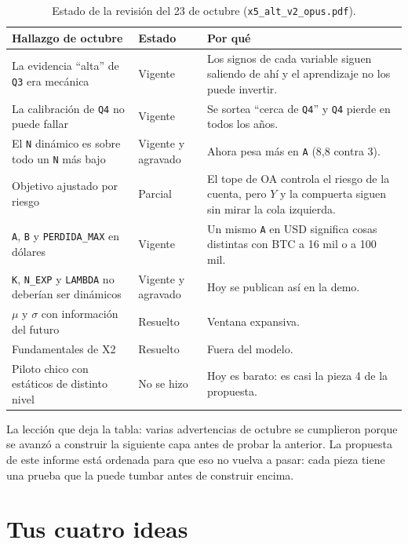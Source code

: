 \documentclass[11pt,a4paper]{article}
\newcommand{\code}[1]{\texttt{\small #1}}
\begin{document}
\begin{table}[h]
\centering\small
\begin{tabularx}{\linewidth}{@{}>{\raggedright\arraybackslash}p{5.4cm}>{\raggedright\arraybackslash}p{2.2cm}>{\raggedright\arraybackslash}X@{}}
\toprule
Hallazgo de octubre & Estado & Por qué \\
\midrule
La evidencia ``alta'' de \code{Q3} era mecánica & Vigente & Los signos de cada variable siguen saliendo de
ahí y el aprendizaje no los puede invertir. \\
La calibración de \code{Q4} no puede fallar & Vigente & Se sortea ``cerca de \code{Q4}'' y \code{Q4} pierde en
todos los años. \\
El \code{N} dinámico es sobre todo un \code{N} más bajo & Vigente y agravado & Ahora pesa más en \code{A}
(8,8 contra 3). \\
Objetivo ajustado por riesgo & Parcial & El tope de OA controla el riesgo de la cuenta, pero $Y$ y la compuerta
siguen sin mirar la cola izquierda. \\
\code{A}, \code{B} y \code{PERDIDA\_MAX} en dólares & Vigente & Un mismo \code{A} en USD significa cosas
distintas con BTC a 16 mil o a 100 mil. \\
\code{K}, \code{N\_EXP} y \code{LAMBDA} no deberían ser dinámicos & Vigente y agravado & Hoy se publican así
en la demo. \\
$\mu$ y $\sigma$ con información del futuro & Resuelto & Ventana expansiva. \\
Fundamentales de X2 & Resuelto & Fuera del modelo. \\
Piloto chico con estáticos de distinto nivel & No se hizo & Hoy es barato: es casi la pieza 4 de la propuesta. \\
\bottomrule
\end{tabularx}
\caption{Estado de la revisión del 23 de octubre (\code{x5\_alt\_v2\_opus.pdf}).}
\end{table}

La lección que deja la tabla: varias advertencias de octubre se cumplieron porque se avanzó a construir
la siguiente capa antes de probar la anterior. La propuesta de este informe está ordenada para que eso no
vuelva a pasar: cada pieza tiene una prueba que la puede tumbar antes de construir encima.

\section{Tus cuatro ideas}
\label{sec:ideas}
\end{document}
